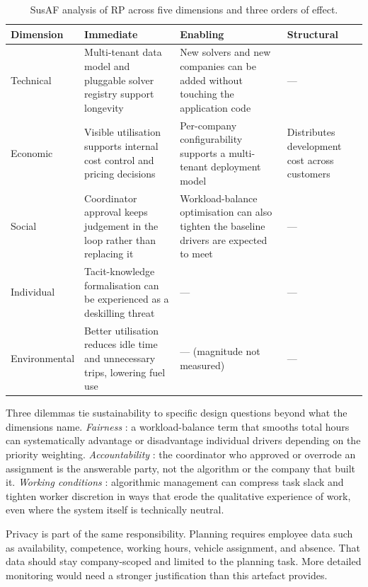 \begin{table}[h]
\centering
\caption{SusAF analysis of RP across five dimensions and three orders of effect.}
\label{tab:susaf}
\small
\begin{tabular}{p{}p{}p{}p{}}
\toprule
\textbf{Dimension} & \textbf{Immediate} & \textbf{Enabling} & \textbf{Structural} \\
\midrule
Technical      & Multi-tenant data model and pluggable solver registry support longevity            & New solvers and new companies can be added without touching the application code & --- \\
Economic       & Visible utilisation supports internal cost control and pricing decisions            & Per-company configurability supports a multi-tenant deployment model             & Distributes development cost across customers \\
Social         & Coordinator approval keeps judgement in the loop rather than replacing it           & Workload-balance optimisation can also tighten the baseline drivers are expected to meet & --- \\
Individual     & Tacit-knowledge formalisation can be experienced as a deskilling threat             & ---                                                                              & --- \\
Environmental  & Better utilisation reduces idle time and unnecessary trips, lowering fuel use       & --- (magnitude not measured)                                                     & --- \\
\bottomrule
\end{tabular}
\end{table}

Three dilemmas tie sustainability to specific design questions beyond what the dimensions name. \textit{Fairness} \parencite{mittelstadt2016algorithms}: a workload-balance term that smooths total hours can systematically advantage or disadvantage individual drivers depending on the priority weighting. \textit{Accountability} \parencite{martin2019accountability}: the coordinator who approved or overrode an assignment is the answerable party, not the algorithm or the company that built it. \textit{Working conditions} \parencite{lee2018understanding}: algorithmic management can compress task slack and tighten worker discretion in ways that erode the qualitative experience of work, even where the system itself is technically neutral.

Privacy is part of the same responsibility. Planning requires employee data such as availability, competence, working hours, vehicle assignment, and absence. That data should stay company-scoped and limited to the planning task. More detailed monitoring would need a stronger justification than this artefact provides.


